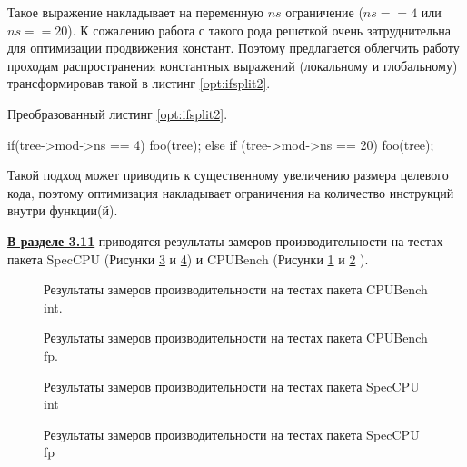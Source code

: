    Такое выражение накладывает на переменную $ns$ ограничение ($ns==4$ или $ns==20$). К сожалению работа с такого рода решеткой очень затруднительна для оптимизации продвижения констант. Поэтому предлагается облегчить работу проходам распространения константных выражений (локальному и глобальному) трансформировав такой в листинг \ref{opt:ifsplit2}.
  \begin{ListingEnv}[!h]
  	\captiondelim{ } %
  	\caption{Преобразованный листинг \ref{opt:ifsplit2}.}\label{opt:ifsplit2}
  	\begin{Verb}
  		if(tree->mod->ns == 4) {	
  			foo(tree);
  		} else if (tree->mod->ns == 20) {
  			foo(tree);
  		}
  	\end{Verb}
  \end{ListingEnv}
  
  Такой подход может приводить к существенному увеличению размера целевого кода, поэтому оптимизация накладывает ограничения на количество инструкций внутри функции(й).
  
  \underline{\textbf{В разделе 3.11}} приводятся результаты замеров производительности на тестах пакета SpecCPU (Рисунки \ref{fig:spec_int_speedup} и \ref{fig:spec_fp_speedup}) и CPUBench (Рисунки \ref{fig:spubench_int_speedup} и \ref{fig:spubench_fp_speedup} ).
  
  \begin{figure}[ht]
  	\caption{Результаты замеров производительности на тестах  пакета CPUBench int.}\label{fig:spubench_int_speedup}
  \end{figure}
    \begin{figure}[ht]
  	\caption{Результаты замеров производительности на тестах  пакета CPUBench fp.}\label{fig:spubench_fp_speedup}
  \end{figure}
  
  \begin{figure}[ht]
  	\caption{Результаты замеров производительности на тестах  пакета SpecCPU int}\label{fig:spec_int_speedup}
  \end{figure}
    \begin{figure}[ht]
  	\caption{Результаты замеров производительности на тестах  пакета SpecCPU fp}\label{fig:spec_fp_speedup}
  \end{figure}
  
